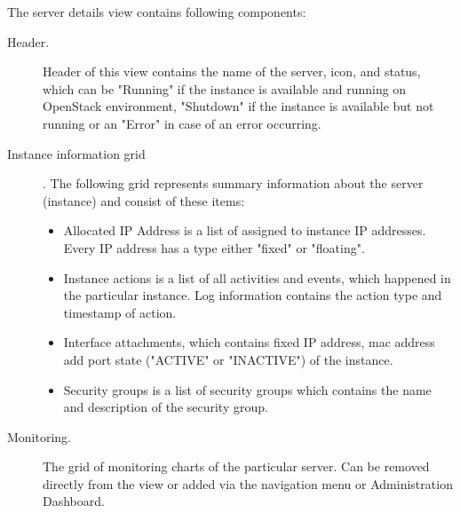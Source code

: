 The server details view contains following components:
\begin{description}
\item[Header.] Header of this view contains the name of the server, icon, and status, which can be "Running" if the instance is available and running on OpenStack environment, "Shutdown" if the instance is available but not running or an "Error" in case of an error occurring. 
\item[Instance information grid]. The following grid represents summary information about the server (instance) and consist of these items:
\begin{itemize}
\item Allocated IP Address is a list of assigned to instance IP addresses. Every IP address has a type either "fixed" or "floating".
\item Instance actions is a list of all activities and events, which happened in the particular instance. Log information contains the action type and timestamp of action.
\item Interface attachments, which contains fixed IP address, mac address add port state ("ACTIVE" or "INACTIVE") of the instance.
\item Security groups is a list of security groups which contains the name and description of the security group. 
\end{itemize}
\item[Monitoring.] The grid of monitoring charts of the particular server. Can be removed directly from the view or added via the navigation menu or Administration Dashboard.
\end{description}


